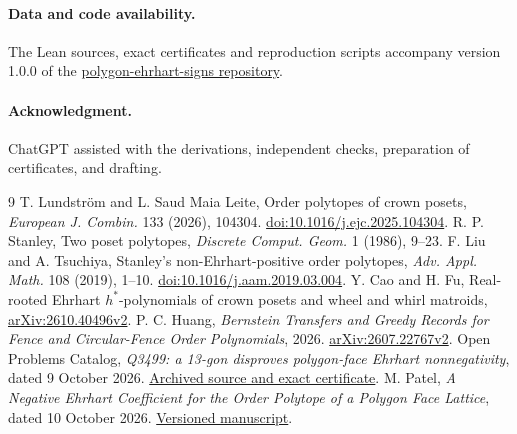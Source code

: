 \documentclass[11pt]{article}
\begin{document}
\paragraph{Data and code availability.}
The Lean sources, exact certificates and reproduction scripts accompany version
1.0.0 of the \href{https://github.com/AlexZander-666/polygon-ehrhart-signs}{polygon-ehrhart-signs repository}.
\paragraph{Acknowledgment.} ChatGPT assisted with the derivations, independent checks, preparation of certificates, and drafting.

\begin{thebibliography}{9}
 T. Lundstr\"om and L. Saud Maia Leite, Order polytopes of
crown posets, \emph{European J. Combin.} 133 (2026), 104304.
\href{https://doi.org/10.1016/j.ejc.2025.104304}{doi:10.1016/j.ejc.2025.104304}.
 R. P. Stanley, Two poset polytopes, \emph{Discrete
Comput. Geom.} 1 (1986), 9--23.
 F. Liu and A. Tsuchiya, Stanley's non-Ehrhart-positive
order polytopes, \emph{Adv. Appl. Math.} 108 (2019), 1--10.
\href{https://doi.org/10.1016/j.aam.2019.03.004}{doi:10.1016/j.aam.2019.03.004}.
 Y. Cao and H. Fu, Real-rooted Ehrhart \(h^*\)-polynomials
of crown posets and wheel and whirl matroids,
\href{https://arxiv.org/abs/2610.40496v2}{arXiv:2610.40496v2}.
P. C. Huang, \emph{Bernstein Transfers and Greedy Records for Fence and
Circular-Fence Order Polynomials}, 2026.
\href{https://arxiv.org/abs/2607.22767v2}{arXiv:2607.22767v2}.
Open Problems Catalog, \emph{Q3499: a 13-gon disproves polygon-face
Ehrhart nonnegativity}, dated 9 October 2026.
\href{https://github.com/10m-u/open-problems-catalog/blob/ca8d4d44ba3db527f19f28928c240168f545ecfe/solutions/seven-more-2026-10-09/discrete/Q3499-proof.md}{Archived source and exact certificate}.
M. Patel, \emph{A Negative Ehrhart Coefficient for the Order Polytope
of a Polygon Face Lattice}, dated 10 October 2026.
\href{https://github.com/mantrakp04/research-papers/blob/c0505c4261045f1ab5760a024f1dfc4fb8f725a8/polygon_ehrhart.md}{Versioned manuscript}.
\end{thebibliography}
\end{document}
